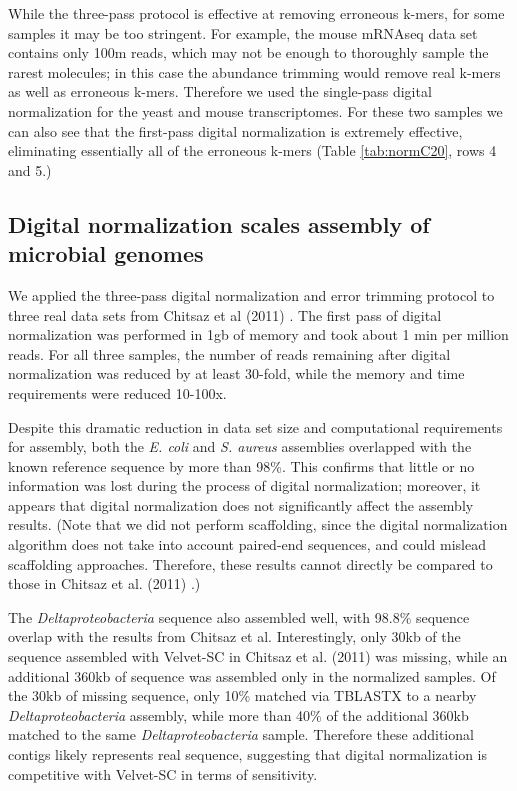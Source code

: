 \documentclass[10pt]{article}
\begin{document}
While the three-pass protocol is effective at removing erroneous
k-mers, for some samples it may be too stringent.  For example, the
mouse mRNAseq data set contains only 100m reads, which may not be
enough to thoroughly sample the rarest molecules; in this case the
abundance trimming would remove real k-mers as well as erroneous k-mers.
Therefore we used the single-pass digital normalization
for the yeast and mouse transcriptomes.  For these two samples we can
also see that the first-pass digital normalization is extremely effective,
eliminating essentially all of the erroneous k-mers (Table \ref{tab:normC20},
rows 4 and 5.)

\subsection*{Digital normalization scales assembly of microbial genomes}

We applied the three-pass digital normalization and error trimming
protocol to three real data sets from Chitsaz et al (2011)
\cite{pubmed21926975}.  The first pass of digital normalization was
performed in 1gb of memory and took about 1 min per million reads.
For all three samples, the number of reads remaining after digital
normalization was reduced by at least 30-fold, while the memory and
time requirements were reduced 10-100x.


Despite this dramatic reduction in data set size and computational
requirements for assembly, both the {\em E. coli} and {\em S. aureus}
assemblies overlapped with the known reference sequence by more than
98\%.  This confirms that little or no information was lost during
the process of digital normalization; moreover, it appears that
digital normalization does not significantly affect the assembly results.
(Note that we did not perform scaffolding, since the digital
normalization algorithm does not take into account paired-end
sequences, and could mislead scaffolding approaches.  Therefore, these
results cannot directly be compared to those in Chitsaz et al. (2011)
\cite{pubmed21926975}.)

The {\em Deltaproteobacteria} sequence also assembled well, with
98.8\% sequence overlap with the results from Chitsaz et al.
Interestingly, only 30kb of the sequence assembled with Velvet-SC in
Chitsaz et al. (2011) was missing, while an additional 360kb of
sequence was assembled only in the normalized samples.  Of the 30kb of
missing sequence, only 10\% matched via TBLASTX to a nearby {\em
  Deltaproteobacteria} assembly, while more than 40\% of the
additional 360kb matched to the same {\em Deltaproteobacteria} sample.
Therefore these additional contigs likely represents real
sequence, suggesting that digital normalization is competitive with
Velvet-SC in terms of sensitivity.
\end{document}

